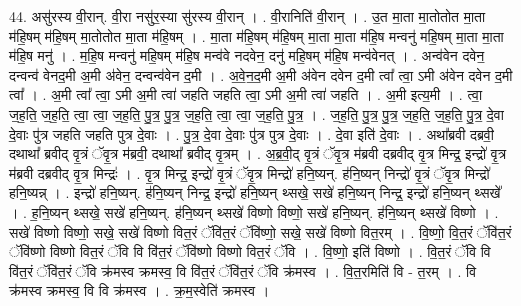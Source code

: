 \documentclass[17pt]{extarticle}
\begin{document}
44. असु॑रस्य वी॒रान्. वी॒रा नसु॑र॒स्या सु॑रस्य वी॒रान् । . वी॒रानिति॑ वी॒रान् । . उ॒त मा॒ता मा॒तोतोत मा॒ता म॑हि॒षम् म॑हि॒षम् मा॒तोतोत मा॒ता म॑हि॒षम् । . मा॒ता म॑हि॒षम् म॑हि॒षम् मा॒ता मा॒ता म॑हि॒ष मन्वनु॑ महि॒षम् मा॒ता मा॒ता म॑हि॒ष मनु॑ । . म॒हि॒ष मन्वनु॑ महि॒षम् म॑हि॒ष मन्व॑वे नदवेन॒ दनु॑ महि॒षम् म॑हि॒ष मन्व॑वेनत् । . अन्व॑वेन दवेन॒ दन्वन्व॑ वेनद॒मी अ॒मी अ॑वेन॒ दन्वन्व॑वेन द॒मी । . अ॒वे॒न॒द॒मी अ॒मी अ॑वेन दवेन द॒मी त्वा᳚ त्वा॒ ऽमी अ॑वेन दवेन द॒मी त्वा᳚ । . अ॒मी त्वा᳚ त्वा॒ ऽमी अ॒मी त्वा॑ जहति जहति त्वा॒ ऽमी अ॒मी त्वा॑ जहति । . अ॒मी इत्य॒मी । . त्वा॒ ज॒ह॒ति॒ ज॒ह॒ति॒ त्वा॒ त्वा॒ ज॒ह॒ति॒ पु॒त्र॒ पु॒त्र॒ ज॒ह॒ति॒ त्वा॒ त्वा॒ ज॒ह॒ति॒ पु॒त्र॒ । . ज॒ह॒ति॒ पु॒त्र॒ पु॒त्र॒ ज॒ह॒ति॒ ज॒ह॒ति॒ पु॒त्र॒ दे॒वा दे॒वाः पु॑त्र जहति जहति पुत्र दे॒वाः । . पु॒त्र॒ दे॒वा दे॒वाः पु॑त्र पुत्र दे॒वाः । . दे॒वा इति॑ दे॒वाः । . अथा᳚ब्रवी दब्रवी॒ दथाथा᳚ ब्रवीद् वृ॒त्रं ॅवृ॒त्र म॑ब्रवी॒ दथाथा᳚ ब्रवीद् वृ॒त्रम् । . अ॒ब्र॒वी॒द् वृ॒त्रं ॅवृ॒त्र म॑ब्रवी दब्रवीद् वृ॒त्र मिन्द्र॒ इन्द्रो॑ वृ॒त्र म॑ब्रवी दब्रवीद् वृ॒त्र मिन्द्रः॑ । . वृ॒त्र मिन्द्र॒ इन्द्रो॑ वृ॒त्रं ॅवृ॒त्र मिन्द्रो॑ हनि॒ष्यन्. ह॑नि॒ष्यन् निन्द्रो॑ वृ॒त्रं ॅवृ॒त्र मिन्द्रो॑ हनि॒ष्यन्न् । . इन्द्रो॑ हनि॒ष्यन्. ह॑नि॒ष्यन् निन्द्र॒ इन्द्रो॑ हनि॒ष्यन् थ्सखे॒ सखे॑ हनि॒ष्यन् निन्द्र॒ इन्द्रो॑ हनि॒ष्यन् थ्सखे᳚ । . ह॒नि॒ष्यन् थ्सखे॒ सखे॑ हनि॒ष्यन्. ह॑नि॒ष्यन् थ्सखे॑ विष्णो विष्णो॒ सखे॑ हनि॒ष्यन्. ह॑नि॒ष्यन् थ्सखे॑ विष्णो । . सखे॑ विष्णो विष्णो॒ सखे॒ सखे॑ विष्णो वित॒रं ॅवि॑त॒रं ॅवि॑ष्णो॒ सखे॒ सखे॑ विष्णो वित॒रम् । . वि॒ष्णो॒ वि॒त॒रं ॅवि॑त॒रं ॅवि॑ष्णो विष्णो वित॒रं ॅवि वि वि॑त॒रं ॅवि॑ष्णो विष्णो वित॒रं ॅवि । . वि॒ष्णो॒ इति॑ विष्णो । . वि॒त॒रं ॅवि वि वि॑त॒रं ॅवि॑त॒रं ॅवि क्र॑मस्व क्रमस्व॒ वि वि॑त॒रं ॅवि॑त॒रं ॅवि क्र॑मस्व । . वि॒त॒रमिति॑ वि - त॒रम् । . वि क्र॑मस्व क्रमस्व॒ वि वि क्र॑मस्व । . क्र॒म॒स्वेति॑ क्रमस्व । \newline
\pagebreak
\end{document}
